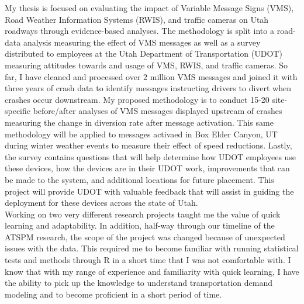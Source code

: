 \documentclass{resume} %
\begin{document}
My thesis is focused on evaluating the impact of Variable Message Signs (VMS), Road Weather Information Systems (RWIS), and traffic cameras on Utah roadways through evidence-based analyses. The methodology is split into a road-data analysis measuring the effect of VMS messages as well as a survey distributed to employees at the Utah Department of Transportation (UDOT) measuring attitudes towards and usage of VMS, RWIS, and traffic cameras. So far, I have cleaned and processed over 2 million VMS messages and joined it with three years of crash data to identify messages instructing drivers to divert when crashes occur downstream. My proposed methodology is to conduct 15-20 site-specific before/after analyses of VMS messages displayed upstream of crashes measuring the change in diversion rate after message activation. This same methodology will be applied to messages activaed in Box Elder Canyon, UT during winter weather events to measure their effect of speed reductions. Lastly, the survey contains questions that will help determine how UDOT employees use these devices, how the devices are in their UDOT work, improvements that can be made to the system, and additional locations for future placement. This project will provide UDOT with valuable feedback that will assist in guiding the deployment for these devices across the state of Utah. \\

Working on two very different research projects taught me the value of quick learning and adaptability. In addition, half-way through our timeline of the ATSPM research, the scope of the project was changed because of unexpected issues with the data. This required me to become familiar with running statistical tests and methods through R in a short time that I was not comfortable with. I know that with my range of experience and familiarity with quick learning, I have the ability to pick up the knowledge to understand transportation demand modeling and to become proficient in a short period of time. \\
\end{document}
